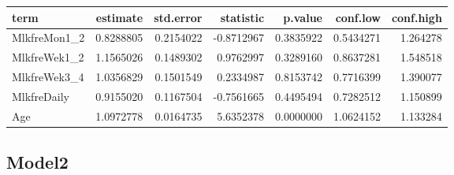 \documentclass[
]{article}
\newenvironment{Shaded}{\begin{snugshade}}{\end{snugshade}}
\newcommand{\DataTypeTok}[1]{\textcolor[rgb]{0.13,0.29,0.53}{#1}}
\newcommand{\KeywordTok}[1]{\textcolor[rgb]{0.13,0.29,0.53}{\textbf{#1}}}
\newcommand{\NormalTok}[1]{#1}
\newcommand{\OperatorTok}[1]{\textcolor[rgb]{0.81,0.36,0.00}{\textbf{#1}}}
\newcommand{\OtherTok}[1]{\textcolor[rgb]{0.56,0.35,0.01}{#1}}
\newcommand{\StringTok}[1]{\textcolor[rgb]{0.31,0.60,0.02}{#1}}
\begin{document}
\begin{longtable}[]{@{}lrrrrrr@{}}
\toprule
term & estimate & std.error & statistic & p.value & conf.low &
conf.high\tabularnewline
\midrule
\endhead
MlkfreMon1\_2 & 0.8288805 & 0.2154022 & -0.8712967 & 0.3835922 &
0.5434271 & 1.264278\tabularnewline
MlkfreWek1\_2 & 1.1565026 & 0.1489302 & 0.9762997 & 0.3289160 &
0.8637281 & 1.548518\tabularnewline
MlkfreWek3\_4 & 1.0356829 & 0.1501549 & 0.2334987 & 0.8153742 &
0.7716399 & 1.390077\tabularnewline
MlkfreDaily & 0.9155020 & 0.1167504 & -0.7561665 & 0.4495494 & 0.7282512
& 1.150899\tabularnewline
Age & 1.0972778 & 0.0164735 & 5.6352378 & 0.0000000 & 1.0624152 &
1.133284\tabularnewline
\bottomrule
\end{longtable}

\hypertarget{model2-4}{%
\subsection{Model2}\label{model2-4}}

\begin{Shaded}
\end{Shaded}
\end{document}
